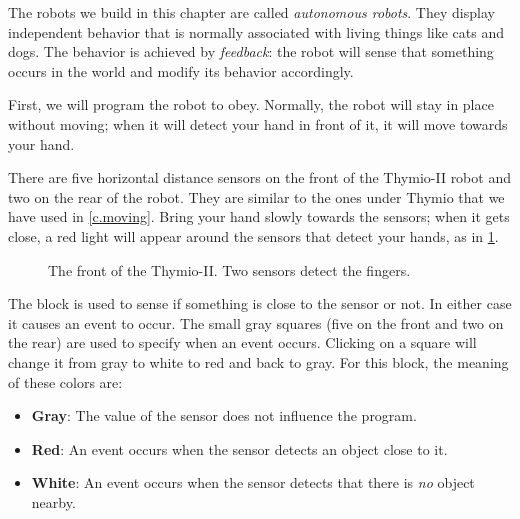 \label{ch.pet}

The robots we build in this chapter are called \emph{autonomous robots}.
They display independent behavior that is normally associated with
living things like cats and dogs. The behavior is achieved by
\textit{feedback}: the robot will sense that something occurs in the
world and modify its behavior accordingly.


First, we will program the robot to obey. Normally, the robot will stay in
place without moving; when it will detect your hand in front of it, it will
move towards your hand.

There are five horizontal distance sensors on the front of the Thymio-II
robot and two on the rear of the robot.
They are similar to the ones under Thymio that we have used in \cref{c.moving}.
Bring your hand slowly towards the
sensors; when it gets close, a red light will appear around the sensors
that detect your hands, as in \cref{fig.detect}.

\begin{figure}
\begin{center}
\caption{The front of the Thymio-II. Two sensors detect the fingers.}\label{fig.detect}
\end{center}
\end{figure}

The block  is used to sense if something is close to the
sensor or not. In either case it causes an event to occur. The small
gray squares (five on the front and two on the rear) are used to specify
when an event occurs. Clicking on a square will change it from gray to
white to red and back to gray.
For this block, the meaning of these colors are:

\begin{itemize}
\item \textbf{Gray}: The value of the sensor does not influence the
program.
\item \textbf{Red}: An event occurs when the sensor detects an object
close to it.
\item \textbf{White}: An event occurs when the sensor detects that there
is \emph{no} object nearby.
\end{itemize}

